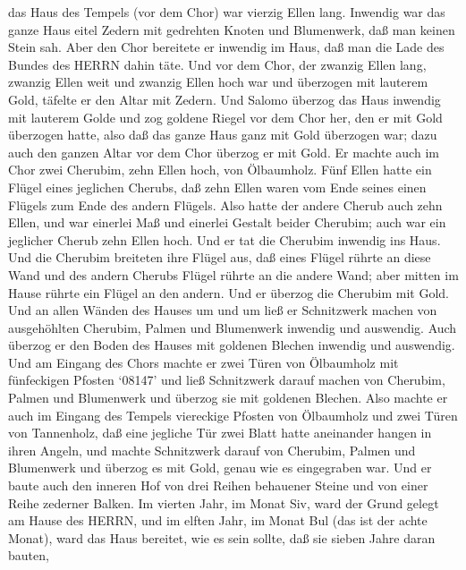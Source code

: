 das Haus des Tempels (vor dem Chor) war vierzig Ellen lang.
 Inwendig war das ganze Haus eitel Zedern mit gedrehten
Knoten und Blumenwerk, daß man keinen Stein sah.  Aber den
Chor bereitete er inwendig im Haus, daß man die Lade des Bundes des
HERRN dahin täte.  Und vor dem Chor, der zwanzig Ellen
lang, zwanzig Ellen weit und zwanzig Ellen hoch war und überzogen mit
lauterem Gold, täfelte er den Altar mit Zedern.  Und Salomo
überzog das Haus inwendig mit lauterem Golde und zog goldene Riegel vor
dem Chor her, den er mit Gold überzogen hatte,  also daß
das ganze Haus ganz mit Gold überzogen war; dazu auch den ganzen Altar
vor dem Chor überzog er mit Gold.  Er machte auch im Chor
zwei Cherubim, zehn Ellen hoch, von Ölbaumholz.  Fünf Ellen
hatte ein Flügel eines jeglichen Cherubs, daß zehn Ellen waren vom Ende
seines einen Flügels zum Ende des andern Flügels.  Also
hatte der andere Cherub auch zehn Ellen, und war einerlei Maß und
einerlei Gestalt beider Cherubim;  auch war ein jeglicher
Cherub zehn Ellen hoch.  Und er tat die Cherubim inwendig
ins Haus. Und die Cherubim breiteten ihre Flügel aus, daß eines Flügel
rührte an diese Wand und des andern Cherubs Flügel rührte an die andere
Wand; aber mitten im Hause rührte ein Flügel an den andern.
 Und er überzog die Cherubim mit Gold.  Und an
allen Wänden des Hauses um und um ließ er Schnitzwerk machen von
ausgehöhlten Cherubim, Palmen und Blumenwerk inwendig und auswendig.
 Auch überzog er den Boden des Hauses mit goldenen Blechen
inwendig und auswendig.  Und am Eingang des Chors machte er
zwei Türen von Ölbaumholz mit fünfeckigen Pfosten  `08147'
und ließ Schnitzwerk darauf machen von Cherubim, Palmen und Blumenwerk
und überzog sie mit goldenen Blechen.  Also machte er auch
im Eingang des Tempels viereckige Pfosten von Ölbaumholz 
und zwei Türen von Tannenholz, daß eine jegliche Tür zwei Blatt hatte
aneinander hangen in ihren Angeln,  und machte Schnitzwerk
darauf von Cherubim, Palmen und Blumenwerk und überzog es mit Gold,
genau wie es eingegraben war.  Und er baute auch den
inneren Hof von drei Reihen behauener Steine und von einer Reihe
zederner Balken.  Im vierten Jahr, im Monat Siv, ward der
Grund gelegt am Hause des HERRN,  und im elften Jahr, im
Monat Bul (das ist der achte Monat), ward das Haus bereitet, wie es sein
sollte, daß sie sieben Jahre daran bauten,

